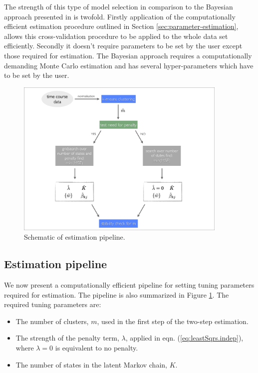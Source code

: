 The strength of this type of model selection in comparison to the Bayesian approach presented in \cite{Armond:2013} is twofold. Firstly application of the computationally efficient estimation procedure outlined in Section \ref{sec:parameter-estimation}, allows this cross-validation procedure to be applied to the whole data set efficiently. Secondly it doesn't require parameters to be set by the user except those required for estimation. The Bayesian approach requires a computationally demanding Monte Carlo estimation and has several hyper-parameters which have to be set by the user. 

\begin{figure}
  \centering
  \includegraphics[width=0.9\textwidth]{pics/pipeline.pdf}
  \caption{Schematic of estimation pipeline.}
  \label{fig:pipeline}
\end{figure}

\subsection{Estimation pipeline}
\label{sec:estim-pipe}

We now present a computationally efficient pipeline for setting tuning parameters required for estimation. The pipeline is also summarized in Figure \ref{fig:pipeline}. The required tuning parameters are:

\begin{itemize}
\item The number of clusters, $m$, used in the first step of the two-step estimation.
\item The strength of the penalty term, $\lambda$, applied in eqn. (\ref{eq:leastSqrs.indep}), where $\lambda=0$ is equivalent to no penalty.
\item The number of states in the latent Markov chain, $K$.
\end{itemize}

